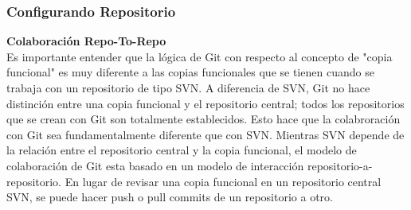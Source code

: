 \documentclass[8pt]{beamer}
\begin{document}
\begin{frame}
\frametitle{Configurando Repositorio}
\textbf{Colaboraci\'on Repo-To-Repo}\\
\medskip
Es importante entender que la l\'ogica de Git con respecto al concepto de "copia funcional" es muy diferente a las copias funcionales que se tienen cuando se trabaja con un repositorio de tipo SVN. A diferencia de SVN, Git no hace distinci\'on entre una copia funcional y el repositorio central; todos los repositorios que se crean con 
Git son totalmente establecidos.
Esto hace que la colabroraci\'on con Git sea fundamentalmente diferente que con SVN. Mientras SVN depende de la relaci\'on entre el repositorio central y la copia funcional, el modelo de colaboraci\'on de Git esta basado en un modelo de interacci\'on repositorio-a-repositorio. En lugar de revisar una copia funcional en un repositorio central SVN, se puede hacer push o pull commits de un repositorio a otro. 
\begin{figure}
  \centering
  \qquad \qquad

\end{figure}
\end{frame}
\end{document}
